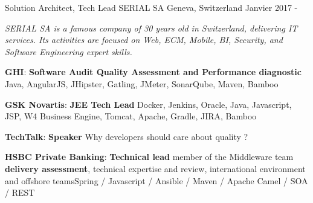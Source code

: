 

\begin{cventries}

\cventry
{Solution Architect, Tech Lead} %
{SERIAL SA} %
{Geneva, Switzerland} %
{Janvier 2017 - } %
{
	\begin{cvitems} %
		\item {\textit{SERIAL SA is a famous company of 30 years old in Switzerland, delivering IT services. Its activities are focused on Web, ECM, Mobile, BI, Security, and Software Engineering expert skills.}}
		\item { \textbf{GHI}: \textbf{Software Audit Quality Assessment and Performance diagnostic} \newline Java, AngularJS, JHipster, Gatling, JMeter, SonarQube, Maven, Bamboo}
		\item { \textbf{GSK Novartis}: \textbf{JEE Tech Lead} \newline Docker, Jenkins, Oracle, Java, Javascript, JSP, W4 Business Engine, Tomcat, Apache, Gradle, JIRA, Bamboo}	
		\item { \textbf{TechTalk}: \textbf{Speaker} \newline Why developers should care about quality ?}		
		\item { \textbf{HSBC Private Banking}: \textbf{Technical lead} \newline member of the Middleware team  \textbf{delivery assessment}, technical expertise and review, international environment and offshore teams\newline Spring / Javascript / Ansible / Maven / Apache Camel / SOA / REST}		
	\end{cvitems}
}


\end{cventries}
